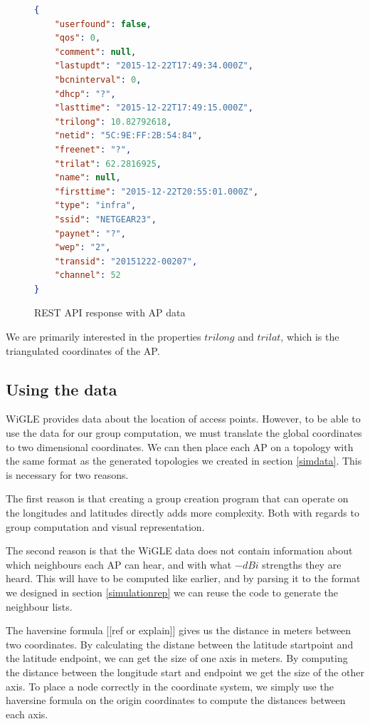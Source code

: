 \documentclass[a4paper,UKenglish]{report}
\begin{document}
\begin{figure}
	\begin{minipage}{\linewidth}

	\begin{lstlisting}[language=json]
{
	"userfound": false,
	"qos": 0,
	"comment": null,
	"lastupdt": "2015-12-22T17:49:34.000Z",
	"bcninterval": 0,
	"dhcp": "?",
	"lasttime": "2015-12-22T17:49:15.000Z",
	"trilong": 10.82792618,
	"netid": "5C:9E:FF:2B:54:84",
	"freenet": "?",
	"trilat": 62.2816925,
	"name": null,
	"firsttime": "2015-12-22T20:55:01.000Z",
	"type": "infra",
	"ssid": "NETGEAR23",
	"paynet": "?",
	"wep": "2",
	"transid": "20151222-00207",
	"channel": 52
}

	\end{lstlisting}

\label{fig:wigle}
	\end{minipage}
	\caption{REST API response with AP data}
\end{figure}

We are primarily interested in the properties $trilong$ and $trilat$, which is
the triangulated coordinates of the AP. 

\subsection{Using the data}
WiGLE provides data about the location of access points. However, to be able to
use the data for our group computation, we must translate the global coordinates
to two dimensional coordinates. We can then place each AP on a topology with the
same format as the generated topologies we created in section \ref{simdata}.
This is necessary for two reasons.

The first reason is that creating a group creation program that can operate
on the longitudes and latitudes directly adds more complexity. Both with regards to
group computation and visual representation. 

The second reason is that the WiGLE data does not contain information about
which neighbours each AP can hear, and with what $-dBi$ strengths they are heard.
This will have to be computed like earlier, and by parsing it to the format
we designed in section \ref{simulationrep} we can reuse the code to generate the neighbour lists.

The haversine formula [[ref or explain]] gives us the distance in meters between two coordinates. By calculating
the distane between the latitude startpoint and the latitude endpoint, we can get the size of one
axis in meters. By computing the distance between the longitude start and endpoint we get the size of the
other axis. To place a node correctly in the coordinate system, we simply use the haversine formula on the
origin coordinates to compute the distances between each axis. 
\end{document}
